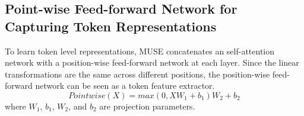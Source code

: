 \documentclass{article} %
\begin{document}
\subsection{Point-wise Feed-forward Network for Capturing Token Representations} %
To learn  token level representations, MUSE concatenates an self-attention network  with a position-wise feed-forward network at each layer.  Since the linear transformations are the same across different positions, the position-wise feed-forward network can be seen as a token feature extractor. %
\begin{equation} 
Pointwise(X) = max(0, XW_1 + b_1)W_2 + b_2
\end{equation}
where $W_1$, $b_1$, $W_2$, and $b_2$ are projection parameters.




\end{document}
